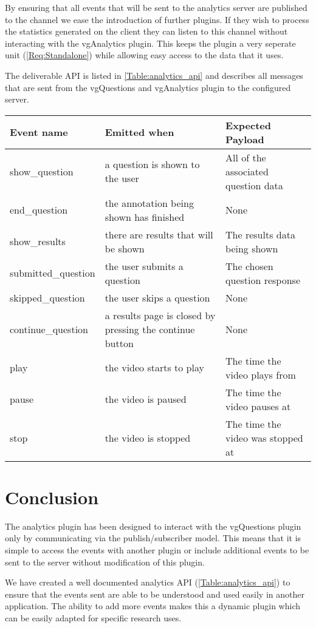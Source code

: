 By ensuring that all events that will be sent to the analytics server are published to the  channel we ease the introduction of further plugins. If they wish to process the statistics generated on the client they  can listen to this channel without interacting with the vgAnalytics plugin. This keeps the plugin a very seperate unit (\cref{Req:Standalone}) while allowing easy access to the data that it uses.

The deliverable API is listed in \autoref{Table:analytics_api} and describes all messages that are sent from the vgQuestions and vgAnalytics plugin to the configured server.

\begin{tabular}{p{3.2cm} p{6cm} p{4cm}}
\caption{\label{Table:analytics_api}API of the emitted analytics events and their data payload}
\textbf{Event name} & \textbf{Emitted when} & \textbf{Expected Payload} \\
\hline
show\_question & a question is shown to the user & All of the associated question data \\
\hline
end\_question & the annotation being shown has finished & None \\
\hline
show\_results & there are results that will be shown & The results data being shown \\
\hline
submitted\_question & the user submits a question & The chosen question response \\
\hline
skipped\_question & the user skips a question & None \\
\hline
continue\_question & a results page is closed by pressing the continue button & None \\
\hline
play & the video starts to play & The time the video plays from \\
\hline
pause & the video is paused & The time the video pauses at \\
\hline
stop & the video is stopped & The time the video was stopped at \\
\end{tabular}

\section{Conclusion}

The analytics plugin has been designed to interact with the \gls{vgQuestions} plugin only by communicating via the publish/subscriber model. This means that it is simple to access the events with another plugin or include additional events to be sent to the server without modification of this plugin.

We have created a well documented analytics \gls{API} (\autoref{Table:analytics_api}) to ensure that the events sent are able to be understood and used easily in another application. The ability to add more events makes this a dynamic plugin which can be easily adapted for specific research uses.